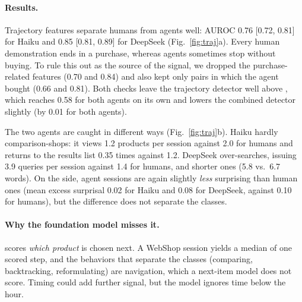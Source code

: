 \paragraph{Results.} Trajectory features separate humans from agents well: AUROC 0.76 [0.72, 0.81] for Haiku and 0.85 [0.81, 0.89] for DeepSeek (Fig.~\ref{fig:traj}a). Every human demonstration ends in a purchase, whereas agents sometimes stop without buying. To rule this out as the source of the signal, we dropped the purchase-related features (0.70 and 0.84) and also kept only pairs in which the agent bought (0.66 and 0.81). Both checks leave the trajectory detector well above \bgpt{}, which reaches 0.58 for both agents on its own and lowers the combined detector slightly (by 0.01 for both agents).

The two agents are caught in different ways (Fig.~\ref{fig:traj}b). Haiku hardly comparison-shops: it views 1.2 products per session against 2.0 for humans and returns to the results list 0.35 times against 1.2. DeepSeek over-searches, issuing 3.9 queries per session against 1.4 for humans, and shorter ones (5.8 vs.\ 6.7 words). On the \bgpt{} side, agent sessions are again slightly \emph{less} surprising than human ones (mean excess surprisal 0.02 for Haiku and 0.08 for DeepSeek, against 0.10 for humans), but the difference does not separate the classes.

\paragraph{Why the foundation model misses it.} \bgpt{} scores \emph{which product} is chosen next. A WebShop session yields a median of one scored step, and the behaviors that separate the classes (comparing, backtracking, reformulating) are navigation, which a next-item model does not score. Timing could add further signal, but the model ignores time below the hour.
